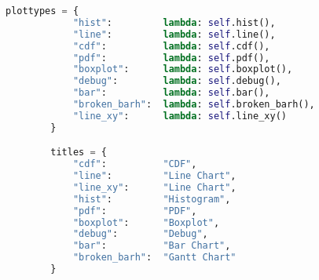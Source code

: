 \begin{lstlisting}[language=Python,caption=myplot.py]
        plottypes = {
            "hist":         lambda: self.hist(),
            "line":         lambda: self.line(),
            "cdf":          lambda: self.cdf(),
            "pdf":          lambda: self.pdf(),
            "boxplot":      lambda: self.boxplot(),
            "debug":        lambda: self.debug(),
            "bar":          lambda: self.bar(),
            "broken_barh":  lambda: self.broken_barh(),
            "line_xy":      lambda: self.line_xy()
        }

        titles = {
            "cdf":          "CDF",
            "line":         "Line Chart",
            "line_xy":      "Line Chart",
            "hist":         "Histogram",
            "pdf":          "PDF",
            "boxplot":      "Boxplot",
            "debug":        "Debug",
            "bar":          "Bar Chart",
            "broken_barh":  "Gantt Chart"
        }


\end{lstlisting}
